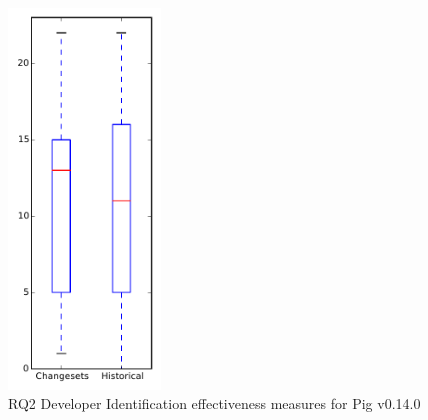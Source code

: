 
\begin{figure}[t]
\centering
\includegraphics[width=0.36\textwidth]{figures/dit/rq2_pig}
\caption{RQ2 Developer Identification effectiveness measures for Pig v0.14.0}
\label{fig:dit:rq2:pig}
\end{figure}
